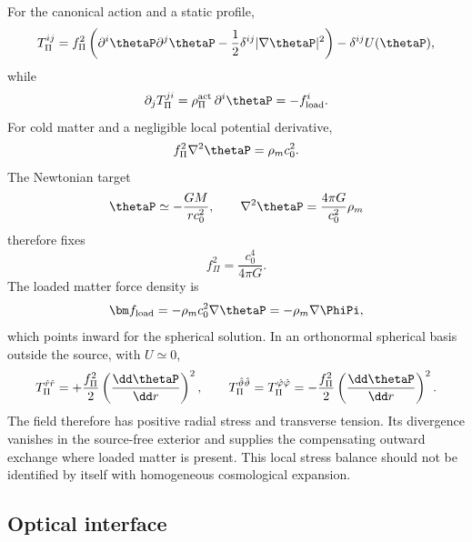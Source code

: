 \documentclass[12pt]{article}
\begin{document}
For the canonical action and a static profile,
\begin{equation}
    T_\Pi^{ij}
    =f_\Pi^2\left(
      \partial^i\thetaP\partial^j\thetaP
      -\frac12\delta^{ij}|\nabla\thetaP|^2
      \right)-\delta^{ij}U(\thetaP),
    \label{eq:static-progression-stress}
\end{equation}
while
\begin{equation}
    \partial_jT_\Pi^{ji}
    =\rho_\Pi^{\rm act}\,\partial^i\thetaP
    =-f_{\rm load}^i .
    \label{eq:static-stress-balance}
\end{equation}
For cold matter and a negligible local potential derivative,
\begin{equation}
    f_\Pi^2\nabla^2\thetaP=\rho_m c_0^2.
    \label{eq:matter-scalar-poisson-match}
\end{equation}
The Newtonian target
\begin{equation}
    \thetaP\simeq-\frac{GM}{rc_0^2},
    \qquad
    \nabla^2\thetaP=\frac{4\pi G}{c_0^2}\rho_m
    \label{eq:matter-theta-poisson-target}
\end{equation}
therefore fixes
\begin{equation}
    \boxed{f_\Pi^2=\frac{c_0^4}{4\pi G}}.
    \label{eq:matter-newtonian-matching-condition}
\end{equation}
The loaded matter force density is
\begin{equation}
    \bm f_{\rm load}
    =-\rho_m c_0^2\nabla\thetaP
    =-\rho_m\nabla\PhiPi,
    \label{eq:newtonian-loaded-force}
\end{equation}
which points inward for the spherical solution.  In an orthonormal spherical basis outside the source, with \(U\simeq0\),
\begin{equation}
    T_\Pi^{\hat r\hat r}
    =+\frac{f_\Pi^2}{2}\left(\frac{\dd\thetaP}{\dd r}\right)^2,
    \qquad
    T_\Pi^{\hat\vartheta\hat\vartheta}
    =T_\Pi^{\hat\varphi\hat\varphi}
    =-\frac{f_\Pi^2}{2}\left(\frac{\dd\thetaP}{\dd r}\right)^2.
    \label{eq:radial-transverse-stress}
\end{equation}
The field therefore has positive radial stress and transverse tension.  Its divergence vanishes in the source-free exterior and supplies the compensating outward exchange where loaded matter is present.  This local stress balance should not be identified by itself with homogeneous cosmological expansion.

\subsection{Optical interface}
\end{document}
